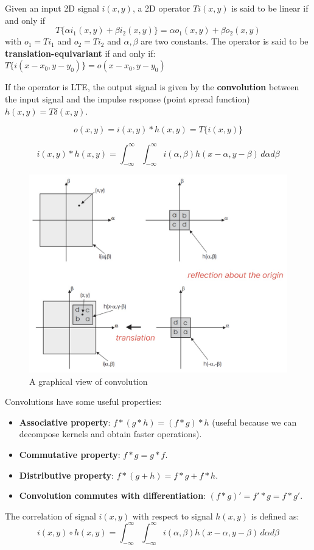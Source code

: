 Given an input 2D signal $i(x,y)$, a 2D operator $T{i(x,y)}$ is said to be linear if and only if
$$ T\{\alpha i_1(x,y) + \beta i_2(x,y)\} = \alpha o_1(x,y) + \beta o_2(x,y) $$ with $o_1 = T{i_1}$ and $o_2 = T{i_2}$ and $\alpha, \beta$ are two constants.
The operator is said to be \textbf{translation-equivariant} if and only if: $T\{i(x-x_0, y-y_0)\} = o(x-x_0, y-y_0)$

If the operator is LTE, the output signal is given by the \textbf{convolution} between the input signal and the impulse response (point spread function) $h(x,y) = T{\delta (x,y)}$.

$$o(x,y) = i(x,y) * h(x,y) = T\{i(x,y)\}$$

$$i(x,y) * h(x,y) = \int_{-\infty}^{\infty} \int_{-\infty}^{\infty} i(\alpha, \beta) h(x-\alpha, y-\beta) \, d\alpha  d\beta $$

\begin{figure}[htbp]
  \centering
  \includegraphics[width=0.6\linewidth]{./img/graphical_convolution.jpg}
  \caption{A graphical view of convolution}
  \label{fig:graphical_convolution}
\end{figure}

Convolutions have some useful properties:
\begin{itemize}
  \item \textbf{Associative property}: $f * (g * h) = (f*g)*h$ (useful because we can decompose kernels and obtain faster operations).
  \item \textbf{Commutative property}: $f*g = g*f$.
  \item \textbf{Distributive property}: $f*(g+h) = f*g + f*h$.
  \item \textbf{Convolution commutes with differentiation}: $(f*g)' = f'*g = f*g'$.
\end{itemize}

The correlation of signal $i(x,y)$  with respect to signal $h(x,y)$ is defined as:
$$i(x,y) \circ h(x,y) = \int_{-\infty}^{\infty} \int_{-\infty}^{\infty} i(\alpha, \beta) h(x-\alpha, y-\beta) \, d\alpha  d\beta $$

